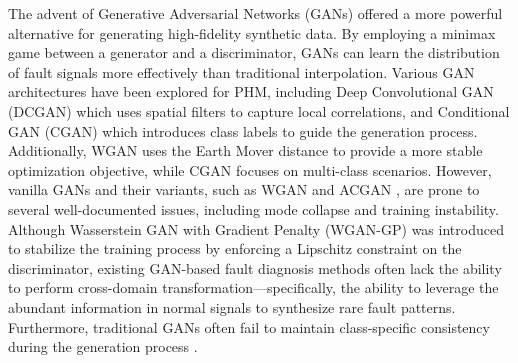 The advent of Generative Adversarial Networks (GANs) \cite{1} offered a more powerful alternative for generating high-fidelity synthetic data. By employing a minimax game between a generator and a discriminator, GANs can learn the distribution of fault signals more effectively than traditional interpolation. Various GAN architectures have been explored for PHM, including Deep Convolutional GAN (DCGAN) which uses spatial filters to capture local correlations, and Conditional GAN (CGAN) which introduces class labels to guide the generation process. Additionally, WGAN uses the Earth Mover distance to provide a more stable optimization objective, while CGAN focuses on multi-class scenarios. However, vanilla GANs and their variants, such as WGAN \cite{2} and ACGAN \cite{5}, are prone to several well-documented issues, including mode collapse and training instability. Although Wasserstein GAN with Gradient Penalty (WGAN-GP) \cite{3} was introduced to stabilize the training process by enforcing a Lipschitz constraint on the discriminator, existing GAN-based fault diagnosis methods \cite{36, 37} often lack the ability to perform cross-domain transformation—specifically, the ability to leverage the abundant information in normal signals to synthesize rare fault patterns. Furthermore, traditional GANs often fail to maintain class-specific consistency during the generation process \cite{4, 36}.

